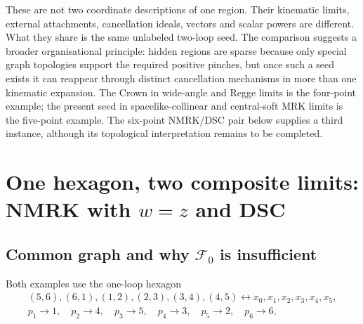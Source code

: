 \documentclass[a4paper,11pt]{article}
\begin{document}
These are not two coordinate descriptions of one region.  Their kinematic
limits, external attachments, cancellation ideals, vectors and scalar powers
are different.  What they share is the same unlabeled two-loop seed.  The
comparison suggests a broader organisational principle: hidden regions are
sparse because only special graph topologies support the required positive
pinches, but once such a seed exists it can reappear through distinct
cancellation mechanisms in more than one kinematic expansion.  The Crown in
wide-angle and Regge limits is the four-point example; the present seed in
spacelike-collinear and central-soft MRK limits is the five-point example.
The six-point NMRK/DSC pair below supplies a third instance, although its
topological interpretation remains to be completed.

\section{One hexagon, two composite limits: NMRK with \texorpdfstring{\(w=z\)}{w=z} and DSC}
\label{sec:example-alignment}

\subsection{Common graph and why \texorpdfstring{\(\mathcal F_0\)}{F0} is insufficient}

Both examples use the one-loop hexagon
\begin{equation}
 \begin{gathered}
 (5,6),(6,1),(1,2),(2,3),(3,4),(4,5)
 \longleftrightarrow x_0,x_1,x_2,x_3,x_4,x_5,\\
 p_1\to1,\quad p_2\to4,\quad p_3\to5,\quad
 p_4\to3,\quad p_5\to2,\quad p_6\to6,
 \end{gathered}
 \label{eq:hexagon-edge-map}
\end{equation}
\end{document}
